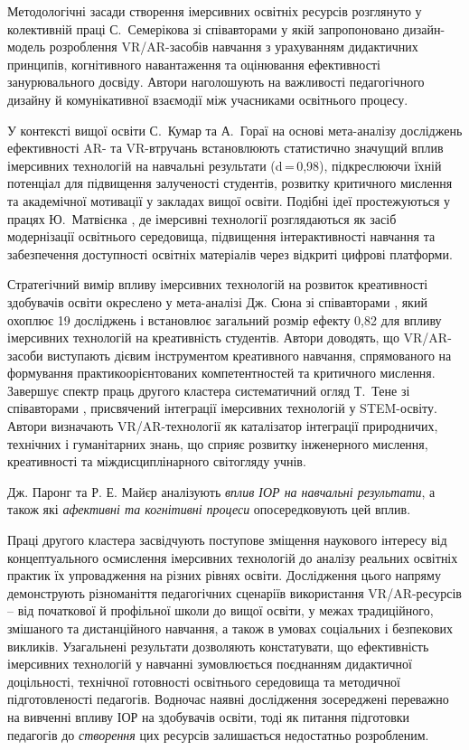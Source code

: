 Методологічні засади створення імерсивних освітніх ресурсів розглянуто у колективній праці С.~Семерікова зі співавторами \cite{Semerikov2022IERDesign} у якій запропоновано дизайн-модель розроблення VR/AR-засобів навчання з урахуванням дидактичних принципів, когнітивного навантаження та оцінювання ефективності занурювального досвіду. Автори наголошують на важливості педагогічного дизайну й комунікативної взаємодії між учасниками освітнього процесу.

У контексті вищої освіти С.~Кумар та А.~Гораї \cite{Gnedina2025Quality} на основі мета-аналізу досліджень ефективності AR- та VR-втручань встановлюють статистично значущий вплив імерсивних технологій на навчальні результати (d\,=\,0{,}98), підкреслюючи їхній потенціал для підвищення залученості студентів, розвитку критичного мислення та академічної мотивації у закладах вищої освіти. Подібні ідеї простежуються у працях Ю.~Матвієнка \cite{Lytvynova2023Comparative}, де імерсивні технології розглядаються як засіб модернізації освітнього середовища, підвищення інтерактивності навчання та забезпечення доступності освітніх матеріалів через відкриті цифрові платформи.

Стратегічний вимір впливу імерсивних технологій на розвиток креативності здобувачів освіти окреслено у мета-аналізі Дж. Сюна зі співавторами \cite{Kindzhibala2025Creative}, який охоплює 19 досліджень і встановлює загальний розмір ефекту 0{,}82 для впливу імерсивних технологій на креативність студентів. Автори доводять, що VR/AR-засоби виступають дієвим інструментом креативного навчання, спрямованого на формування практикоорієнтованих компетентностей та критичного мислення. Завершує спектр праць другого кластера систематичний огляд Т.~Тене зі співавторами \cite{Medvedieva2024STEAM}, присвячений інтеграції імерсивних технологій у STEM-освіту. Автори визначають VR/AR-технології як каталізатор інтеграції природничих, технічних і гуманітарних знань, що сприяє розвитку інженерного мислення, креативності та міждисциплінарного світогляду учнів.

Дж. Паронг та Р. Е. Майєр \cite{Parong2021Cognitive} аналізують \emph{вплив ІОР на навчальні результати}, а також які \emph{афективні та когнітивні процеси} опосередковують цей вплив.

Праці другого кластера засвідчують поступове зміщення наукового інтересу від концептуального осмислення імерсивних технологій до аналізу реальних освітніх практик їх упровадження на різних рівнях освіти. Дослідження цього напряму демонструють різноманіття педагогічних сценаріїв використання VR/AR-ресурсів -- від початкової й профільної школи до вищої освіти, у межах традиційного, змішаного та дистанційного навчання, а також в умовах соціальних і безпекових викликів. Узагальнені результати дозволяють констатувати, що ефективність імерсивних технологій у навчанні зумовлюється поєднанням дидактичної доцільності, технічної готовності освітнього середовища та методичної підготовленості педагогів. Водночас наявні дослідження зосереджені переважно на вивченні впливу ІОР на здобувачів освіти, тоді як питання підготовки педагогів до \emph{створення} цих ресурсів залишається недостатньо розробленим.

